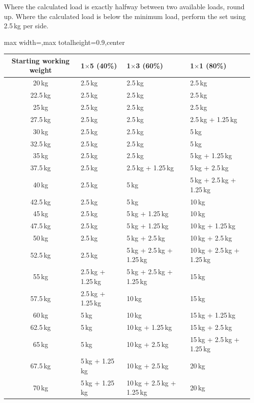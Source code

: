 \documentclass[11pt,a4paper]{article}
\newcommand{\tablearraystretch}{1.15}
\begin{document}
Where the calculated load is exactly halfway between two available loads, round up. Where the calculated load is below the minimum load, perform the set using 2.5\,kg per side.

\begin{center}
\renewcommand{\arraystretch}{\tablearraystretch}
\begin{adjustbox}{max width=\linewidth,max totalheight=0.9\textheight,center}
\begin{tabular}{c p{4.3cm} p{4.3cm} p{4.3cm}}
\toprule
Starting working weight &
1$\times$5 (40\%) &
1$\times$3 (60\%) &
1$\times$1 (80\%) \\
\midrule
20\,kg   & 2.5\,kg & 2.5\,kg & 2.5\,kg \\
22.5\,kg & 2.5\,kg & 2.5\,kg & 2.5\,kg \\
25\,kg   & 2.5\,kg & 2.5\,kg & 2.5\,kg \\
27.5\,kg & 2.5\,kg & 2.5\,kg & 2.5\,kg + 1.25\,kg \\
30\,kg   & 2.5\,kg & 2.5\,kg & 5\,kg \\
32.5\,kg & 2.5\,kg & 2.5\,kg & 5\,kg \\
35\,kg   & 2.5\,kg & 2.5\,kg & 5\,kg + 1.25\,kg \\
37.5\,kg & 2.5\,kg & 2.5\,kg + 1.25\,kg & 5\,kg + 2.5\,kg \\
40\,kg   & 2.5\,kg & 5\,kg & 5\,kg + 2.5\,kg + 1.25\,kg \\
42.5\,kg & 2.5\,kg & 5\,kg & 10\,kg \\
45\,kg   & 2.5\,kg & 5\,kg + 1.25\,kg & 10\,kg \\
47.5\,kg & 2.5\,kg & 5\,kg + 1.25\,kg & 10\,kg + 1.25\,kg \\
50\,kg   & 2.5\,kg & 5\,kg + 2.5\,kg & 10\,kg + 2.5\,kg \\
52.5\,kg & 2.5\,kg & 5\,kg + 2.5\,kg + 1.25\,kg & 10\,kg + 2.5\,kg + 1.25\,kg \\
55\,kg   & 2.5\,kg + 1.25\,kg & 5\,kg + 2.5\,kg + 1.25\,kg & 15\,kg \\
57.5\,kg & 2.5\,kg + 1.25\,kg & 10\,kg & 15\,kg \\
60\,kg   & 5\,kg & 10\,kg & 15\,kg + 1.25\,kg \\
62.5\,kg & 5\,kg & 10\,kg + 1.25\,kg & 15\,kg + 2.5\,kg \\
65\,kg   & 5\,kg & 10\,kg + 2.5\,kg & 15\,kg + 2.5\,kg + 1.25\,kg \\
67.5\,kg & 5\,kg + 1.25\,kg & 10\,kg + 2.5\,kg & 20\,kg \\
70\,kg   & 5\,kg + 1.25\,kg & 10\,kg + 2.5\,kg + 1.25\,kg & 20\,kg \\

\end{tabular}
\end{adjustbox}
\end{center}
\end{document}
